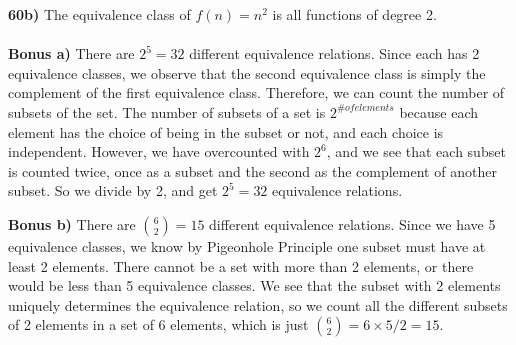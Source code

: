 \documentclass{article}
\begin{document}
\noindent\textbf{60b)} The equivalence class of $f(n) = n^2$ is all functions of degree 2. 
\\\\
\noindent\textbf{Bonus a)} There are $2^5 = 32$ different equivalence relations. Since each has 2 equivalence classes, we observe that the second equivalence class is simply the complement of the first equivalence class. Therefore, we can count the number of subsets of the set. The number of subsets of a set is $2^{\# of elements}$ because each element has the choice of being in the subset or not, and each choice is independent. However, we have overcounted with $2^6$, and we see that each subset is counted twice, once as a subset and the second as the complement of another subset. So we divide by 2, and get $2^5 = 32$ equivalence relations.

\noindent\textbf{Bonus b)}  There are $\binom{6}{2} = 15$ different equivalence relations. Since we have 5 equivalence classes, we know by Pigeonhole Principle one subset must have at least 2 elements. There cannot be a set with more than 2 elements, or there would be less than 5 equivalence classes. We see that the subset with 2 elements uniquely determines the equivalence relation, so we count all the different subsets of 2 elements in a set of 6 elements, which is just $\binom{6}{2} = 6 \times 5 / 2 = 15$.
\end{document}
